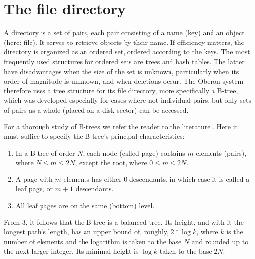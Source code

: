 \section{The file directory}
\label{sec:dir}
A directory is a set of pairs, each pair consisting of a name (key) and an object (here: file). It
serves to retrieve objects by their name. If efficiency matters, the directory is organized as an
ordered set, ordered according to the keys. The most frequently used structures for ordered sets
are trees and hash tables. The latter have disadvantages when the size of the set is unknown,
particularly when its order of magnitude is unknown, and when deletions occur. The Oberon system
therefore uses a tree structure for its file directory, more specifically a B-tree, which was
developed especially for cases where not individual pairs, but only sets of pairs as a whole (placed on
a disk sector) can be accessed.

For a thorough study of B-trees we refer the reader to the literature \cite{Bayer, Comer}. Here it must
suffice to specify the B-tree's principal characteristics:
\begin{enumerate}
  \item In a B-tree of order $N$, each node (called page) contains $m$ elements (pairs), where
    $N \leq m \leq 2N$, except the root, where $0 \leq m \leq 2N$.
  \item A page with $m$ elements has either $0$ descendants, in which case it is called a leaf page, or
    $m + 1$ descendants.
  \item All leaf pages are on the same (bottom) level.
\end{enumerate}
From 3, it follows that the B-tree is a balanced tree. Its height, and with it the longest path's
length, has an upper bound of, roughly, $2 * \log{k}$, where $k$ is the number of elements and the
logarithm is taken to the base $N$ and rounded up to the next larger integer. Its minimal height is
$\log{k}$ taken to the base $2N$.


